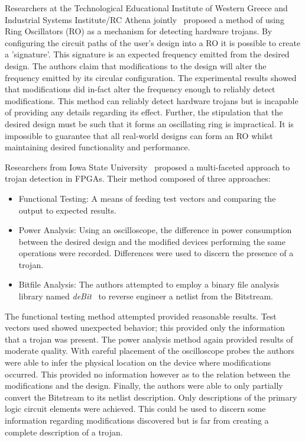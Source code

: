 \documentclass[journal, hidelinks]{IEEEtran}
\begin{document}
Researchers at the Technological Educational Institute of Western Greece and Industrial Systems Institute/RC Athena jointly~\cite{ringOscillatorMethod} proposed a method of using Ring Oscillators (RO) as a mechanism for detecting hardware trojans.
By configuring the circuit paths of the user's design into a RO it is possible to create a 'signature'.
This signature is an expected frequency emitted from the desired design. 
The authors claim that modifications to the design will alter the frequency emitted by its circular configuration.
The experimental results showed that modifications did in-fact alter the frequency enough to reliably detect modifications.
This method can reliably detect hardware trojans but is incapable of providing any details regarding its effect.
Further, the stipulation that the desired design must be such that it forms an oscillating ring is impractical.
It is impossible to guarantee that all real-world designs can form an RO whilst maintaining desired functionality and performance.

Researchers from Iowa State University~\cite{multiFacetedApproach} proposed a multi-faceted approach to trojan detection in FPGAs.
Their method composed of three approaches:
\begin{itemize}
	\item Functional Testing: A means of feeding test vectors and comparing the output to expected results.
	\item Power Analysis: Using an oscilloscope, the difference in power consumption between the desired design and the modified devices performing the same operations were recorded. Differences were used to discern the presence of a trojan.
	\item Bitfile Analysis: The authors attempted to employ a binary file analysis library named \textit{deBit}~\cite{bitStreamToNetlist} to reverse engineer a netlist from the Bitstream.
\end{itemize}
The functional testing method attempted provided reasonable results. 
Test vectors used showed unexpected behavior; this provided only the information that a trojan was present.
The power analysis method again provided results of moderate quality.
With careful placement of the oscilloscope probes the authors were able to infer the physical location on the device where modifications occurred.
This provided no information however as to the relation between the modifications and the design.
Finally, the authors were able to only partially convert the Bitstream to its netlist description.
Only descriptions of the primary logic circuit elements were achieved.
This could be used to discern some information regarding modifications discovered but is far from creating a complete description of a trojan.
\end{document}
